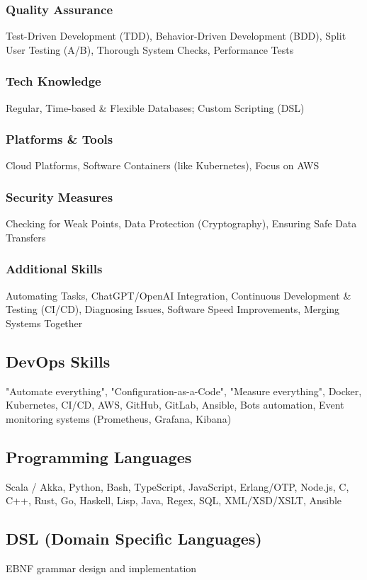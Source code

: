 \subsubsection*{Quality Assurance}
Test-Driven Development (TDD), Behavior-Driven Development (BDD), Split User Testing (A/B), Thorough System Checks, Performance Tests

\subsubsection*{Tech Knowledge}
Regular, Time-based \& Flexible Databases; Custom Scripting (DSL)

\subsubsection*{Platforms \& Tools}
Cloud Platforms, Software Containers (like Kubernetes), Focus on AWS

\subsubsection*{Security Measures}
Checking for Weak Points, Data Protection (Cryptography), Ensuring Safe Data Transfers

\subsubsection*{Additional Skills}
Automating Tasks, ChatGPT/OpenAI Integration, Continuous Development \& Testing (CI/CD), Diagnosing Issues, Software Speed Improvements, Merging Systems Together

\subsection*{DevOps Skills}
"Automate everything", "Configuration-as-a-Code", "Measure everything", Docker, Kubernetes, CI/CD, AWS, GitHub, GitLab, Ansible, Bots automation, Event monitoring systems (Prometheus, Grafana, Kibana)

\subsection*{Programming Languages}
Scala / Akka, Python, Bash, TypeScript, JavaScript, Erlang/OTP, Node.js, C, C++, Rust, Go, Haskell, Lisp, Java, Regex, SQL, XML/XSD/XSLT, Ansible

\subsection*{DSL (Domain Specific Languages)}
EBNF grammar design and implementation

